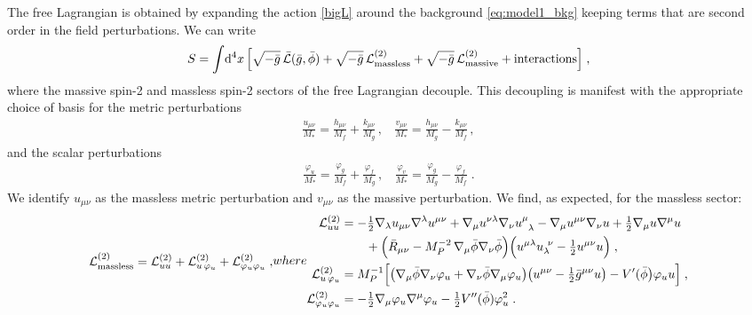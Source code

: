 \documentclass[11pt,a4paper]{article}
\newcommand{\ba}[1]{\begin{align} #1 \end{align}}
\newcommand{\Lcal}{\mathcal{L}}
\newcommand{\MP}{M_P}
\newcommand{\bea}{\begin{eqnarray}}
\newcommand{\eea}{\end{eqnarray}}
\begin{document}
The free Lagrangian is obtained by expanding the action \eqref{bigL} around the background \eqref{eq:model1_bkg} keeping terms that are second order in the field perturbations.  We can write 
\ba{
	S = \int \! \mathrm{d}^4x \, \Bigl[ \sqrt{-\bar{g}} \, \bar{\mathcal{L}}(\bar{g},\bar{\phi}) + \sqrt{-\bar{g}} \, \mathcal{L}_\mathrm{massless}^{(2)} + \sqrt{-\bar{g}} \, \mathcal{L}_\mathrm{massive}^{(2)} + \text{interactions} \Bigr] 
	\;,
}
where the massive spin-2 and massless spin-2 sectors of the free Lagrangian decouple.  This decoupling is manifest with the appropriate choice of basis for the metric perturbations~\cite{Hassan:2011zd}
\bea\label{eq:uv_to_hk}
	\frac{u_{\mu\nu}}{M_*} = \frac{h_{\mu\nu}}{M_f}+ \frac{k_{\mu\nu}}{M_g} \, , ~~~~\frac{v_{\mu\nu}}{M_*} = \frac{h_{\mu\nu}}{M_g}- \frac{k_{\mu\nu}}{M_f} \, ,
\eea
and the scalar perturbations 
\bea\label{eq:phigftophiuv}
	\frac{\varphi_u}{M_*} = \frac{\varphi_g}{M_f} + \frac{ \varphi_f }{M_g}\, , ~~~~  \frac{\varphi_v}{M_*} = \frac{\varphi_g}{M_g}  - \frac{\varphi_f}{M_f}  
	\;.
\eea
We identify $u_{\mu\nu}$ as the massless metric perturbation and $v_{\mu\nu}$ as the massive perturbation.  We find, as expected, for the massless sector: 
\begin{subequations}\label{eq:model1_L2_massless}
\begin{align}
	\Lcal^{(2)}_{\rm massless} 
	= \Lcal^{(2)}_{uu} + \Lcal^{(2)}_{u\,\varphi_u} + \Lcal^{(2)}_{\varphi_u\varphi_u}
	\;,
\end{align}
where
\ba{
	\Lcal^{(2)}_{uu} 
	& = 
	- \tfrac{1}{2} \nabla_\lambda u_{\mu\nu} \nabla^\lambda u^{\mu\nu} 
	+ \nabla_\mu u^{\nu\lambda} \nabla_\nu u\indices{^\mu_\lambda} 
	- \nabla_\mu u^{\mu\nu} \nabla_\nu u 
	+ \tfrac{1}{2} \nabla_\mu u  \nabla^\mu u 
	\\ & \qquad 
	+ \Bigl( \bar{R}_{\mu\nu} - \MP^{-2}\, \nabla_\mu \bar{\phi} \nabla_\nu \bar{\phi} \Bigr) 
	\Bigl( u^{\mu\lambda} u_\lambda^{~\nu} - \tfrac{1}{2} u^{\mu\nu} u \Bigr) 
	\;, \nonumber \\
	\Lcal^{(2)}_{u\,\varphi_u} 
	& = 
	\MP^{-1} \Bigl[ 
	\bigl( \nabla_\mu \bar{\phi} \nabla_\nu \varphi_u + \nabla_\nu \bar{\phi} \nabla_\mu \varphi_u \bigr) 
	\bigl( u^{\mu\nu} - \tfrac{1}{2} \bar{g}^{\mu\nu}u \bigr) - V'(\bar{\phi} \bigr) \varphi_u u \Bigr] 
	\;, \\
	\Lcal^{(2)}_{\varphi_u \varphi_u} 
	& = 
	- \tfrac{1}{2} \nabla_\mu \varphi_u \nabla^\mu \varphi_u 
	- \tfrac{1}{2} V''(\bar{\phi}) \varphi_u^2 
	\label{eq:phi_uphi_u}
	\;.
}
\end{subequations}
\end{document}
